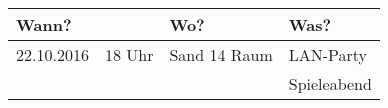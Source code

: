 \large \centering
\begin{tabular}{llll}
	Wann? & & Wo? & Was?\\
	\hline
	22.10.2016 	& 18 Uhr	& Sand 14 Raum 	& LAN-Party \\
				&			&				& Spieleabend \\
\end{tabular}